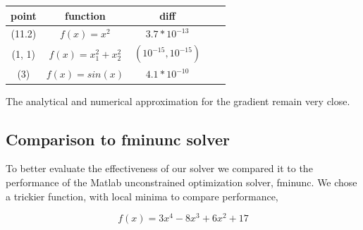 \documentclass[10pt,twocolumn]{article}
\begin{document}
\begin{center}
  \begin{tabular}{ | c | c | c | c | c | }
    \hline
     point & function  & diff \\ \hline
     (11.2) & $f(x) = x^2$ & $3.7*10^{-13}$ \\ \hline
     (1, 1) & $f(x) = x_1^2+ x_2^2$ & $(10^{-15}, 10^{-15})$ \\ \hline
     (3) & $f(x) = sin(x)$ & $4.1*10^{-10}$ \\ 
    \hline
  \end{tabular}
\end{center}

The analytical and numerical approximation for the gradient remain very close.

\subsection*{Comparison to fminunc solver}

To better evaluate the effectiveness of our solver we compared it to the performance of the Matlab unconstrained optimization solver, fminunc. We chose a trickier function, with local minima to compare performance, 

\begin{equation}
f(x)= 3x^4-8x^3+6x^2+17
\end{equation}
\end{document}
